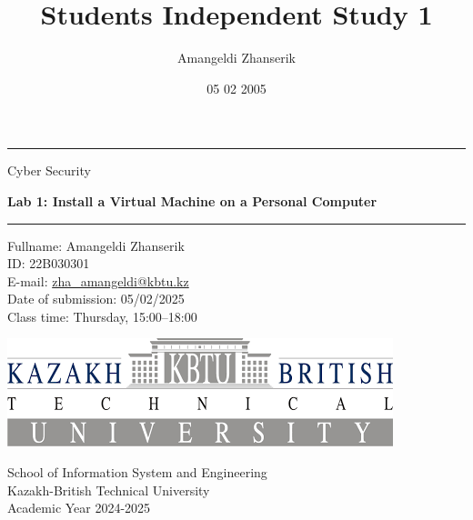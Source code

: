 \documentclass{article}
\title{Students Independent Study 1}
\author{Amangeldi Zhanserik}
\date{05 02 2005}
\begin{document}
\begin{titlepage}
    \centering

    \vspace*{1cm}

    \rule{\textwidth}{1pt}

    \vspace{2\baselineskip}

    {\huge  Cyber Security } \\

    \vspace{1\baselineskip}

    {\huge \textbf{ Lab 1: Install a Virtual Machine on a Personal Computer}}

    \vspace{2\baselineskip}

    \rule{\textwidth}{1pt}

    \vspace{1cm}

    \large

    \begin{flushleft}
        \begin{minipage}{.8\textwidth}
            \raggedright
            Fullname: Amangeldi Zhanserik \\
            ID: 22B030301 \\
            E-mail: {\normalsize \url{zha_amangeldi@kbtu.kz}} \\
            Date of submission: 05/02/2025 \\
            Class time: Thursday, 15:00--18:00 \\
        \end{minipage}%
    \end{flushleft}

    \vspace{2cm}

    \includegraphics[width=.7\textwidth]{logo-kbtu.png}

    \vfill

    School of Information System and Engineering \\
    Kazakh-British Technical University \\
    Academic Year 2024-2025 \\
\end{titlepage}
\end{document}
